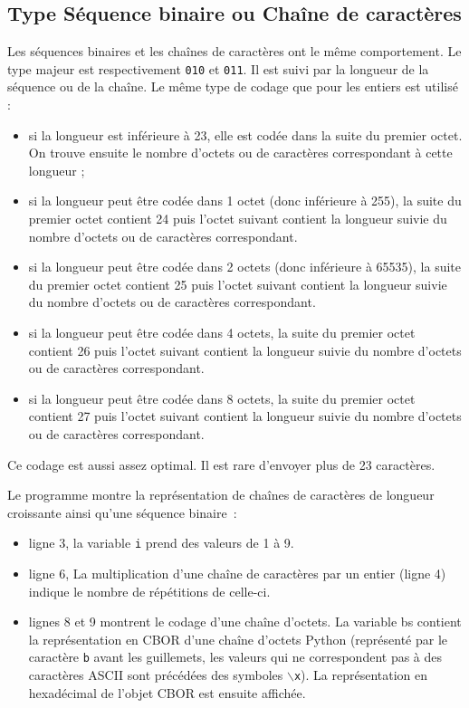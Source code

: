 \subsection{Type Séquence binaire ou Chaîne de caractères}

Les séquences binaires et les chaînes de caractères ont le même comportement. Le type majeur est respectivement \texttt{010} et \texttt{011}. Il est suivi par la longueur de la séquence ou de la chaîne. Le même type de codage que pour les entiers est utilisé :
\begin{itemize}
    \item si la longueur est inférieure à 23, elle est codée dans la suite du premier octet. On trouve ensuite le nombre d'octets ou de caractères correspondant à cette longueur ;
    \item si la longueur peut être codée dans 1 octet (donc inférieure à 255), la suite du premier octet contient 24 puis l'octet suivant contient la longueur suivie du nombre d'octets ou de caractères correspondant.
    \item si la longueur peut être codée dans 2 octets (donc inférieure à 65535), la suite du premier octet contient 25 puis l'octet suivant contient la longueur suivie du nombre d'octets ou de caractères correspondant.
    \item si la longueur peut être codée dans 4 octets, la suite du premier octet contient 26 puis l'octet suivant contient la longueur suivie du nombre d'octets ou de caractères correspondant.
    \item si la longueur peut être codée dans 8 octets, la suite du premier octet contient 27 puis l'octet suivant contient la longueur suivie du nombre d'octets ou de caractères correspondant.
\end{itemize}

       \vspace{1em}

Ce codage est aussi assez optimal. Il est rare d'envoyer plus de 23 caractères.


Le programme  montre la représentation de chaînes de caractères de longueur croissante ainsi qu'une séquence binaire~:

\begin{itemize}
    \item ligne 3, la variable \texttt{i} prend des valeurs de 1 à 9.
    \item ligne 6, La multiplication d'une chaîne de caractères par un entier (ligne 4) indique le nombre de répétitions de celle-ci.
    \item lignes 8 et 9 montrent le codage d'une chaîne d'octets. La variable bs contient la représentation en CBOR d'une chaîne d'octets Python (représenté par le caractère \texttt{b} avant les guillemets, les valeurs qui ne correspondent pas à des caractères ASCII sont précédées des symboles \texttt{$\backslash$x}). La représentation en hexadécimal de l'objet CBOR est ensuite affichée.
\end{itemize}

